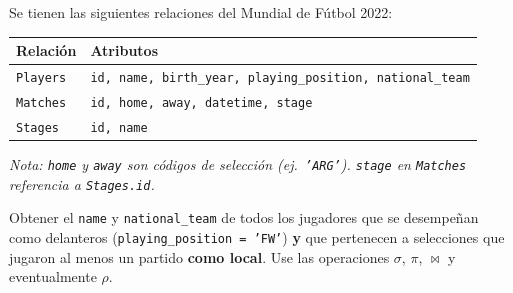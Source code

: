 \documentclass[11pt,a4paper]{article}
\begin{document}
Se tienen las siguientes relaciones del Mundial de Fútbol 2022:

\begin{center}
\begin{tabular}{ll}
\toprule
\textbf{Relación} & \textbf{Atributos} \\
\midrule
\texttt{Players} & \texttt{id, name, birth\_year, playing\_position, national\_team} \\
\texttt{Matches}  & \texttt{id, home, away, datetime, stage} \\
\texttt{Stages}   & \texttt{id, name} \\
\bottomrule
\end{tabular}
\end{center}

\noindent\small\textit{Nota: \texttt{home} y \texttt{away} son códigos de selección (ej.\ \texttt{'ARG'}). \texttt{stage} en \texttt{Matches} referencia a \texttt{Stages.id}.}

\normalsize\vspace{6pt}

Obtener el \texttt{name} y \texttt{national\_team} de todos los jugadores que se desempeñan como delanteros (\texttt{playing\_position = 'FW'}) \textbf{y} que pertenecen a selecciones que jugaron al menos un partido \textbf{como local}. Use las operaciones $\sigma$, $\pi$, $\bowtie$ y eventualmente $\rho$.
\end{document}
